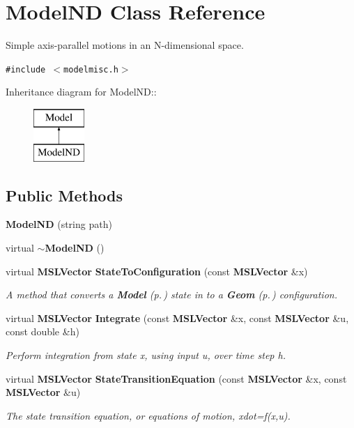 \section{Model\-ND  Class Reference}
\label{classModelND}
Simple axis-parallel motions in an N-dimensional space. 


{\tt \#include $<$modelmisc.h$>$}

Inheritance diagram for Model\-ND::\begin{figure}[H]
\begin{center}
\leavevmode
\includegraphics[height=2cm]{classModelND}
\end{center}
\end{figure}
\subsection*{Public Methods}
\begin{CompactItemize}
\item 
{\bf Model\-ND} (string path)
\item 
virtual {\bf $\sim$Model\-ND} ()
\item 
virtual {\bf MSLVector} {\bf State\-To\-Configuration} (const {\bf MSLVector} \&x)
\begin{CompactList}\small\item\em A method that converts a {\bf Model} {\rm (p.\,\pageref{classModel})} state in to a {\bf Geom} {\rm (p.\,\pageref{classGeom})} configuration.\item\end{CompactList}\item 
virtual {\bf MSLVector} {\bf Integrate} (const {\bf MSLVector} \&x, const {\bf MSLVector} \&u, const double \&h)
\begin{CompactList}\small\item\em Perform integration from state x, using input u, over time step h.\item\end{CompactList}\item 
virtual {\bf MSLVector} {\bf State\-Transition\-Equation} (const {\bf MSLVector} \&x, const {\bf MSLVector} \&u)
\begin{CompactList}\small\item\em The state transition equation, or equations of motion, xdot=f(x,u).\item\end{CompactList}\end{CompactItemize}
